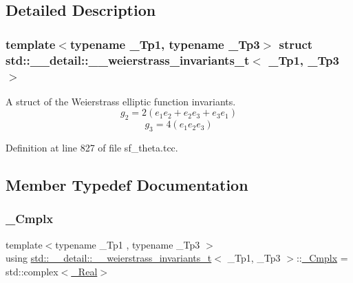 \subsection{Detailed Description}
\subsubsection*{template$<$typename \+\_\+\+Tp1, typename \+\_\+\+Tp3$>$\newline
struct std\+::\+\_\+\+\_\+detail\+::\+\_\+\+\_\+weierstrass\+\_\+invariants\+\_\+t$<$ \+\_\+\+Tp1, \+\_\+\+Tp3 $>$}

A struct of the Weierstrass elliptic function invariants. \[ g_2 = 2(e_1 e_2 + e_2 e_3 + e_3 e_1) \] \[ g_3 = 4(e_1 e_2 e_3) \] 

Definition at line 827 of file sf\+\_\+theta.\+tcc.



\subsection{Member Typedef Documentation}
\mbox{\label{structstd_1_1____detail_1_1____weierstrass__invariants__t_a611ce9f1f3676ff9615d4205b6115528}} 
\subsubsection{\texorpdfstring{\+\_\+\+Cmplx}{\_Cmplx}}
{\footnotesize\ttfamily template$<$typename \+\_\+\+Tp1 , typename \+\_\+\+Tp3 $>$ \\
using \hyperlink{structstd_1_1____detail_1_1____weierstrass__invariants__t}{std\+::\+\_\+\+\_\+detail\+::\+\_\+\+\_\+weierstrass\+\_\+invariants\+\_\+t}$<$ \+\_\+\+Tp1, \+\_\+\+Tp3 $>$\+::\hyperlink{structstd_1_1____detail_1_1____weierstrass__invariants__t_a611ce9f1f3676ff9615d4205b6115528}{\+\_\+\+Cmplx} =  std\+::complex$<$\hyperlink{structstd_1_1____detail_1_1____weierstrass__invariants__t_a7990bba8f3b3d155a80d051c86de1460}{\+\_\+\+Real}$>$}



